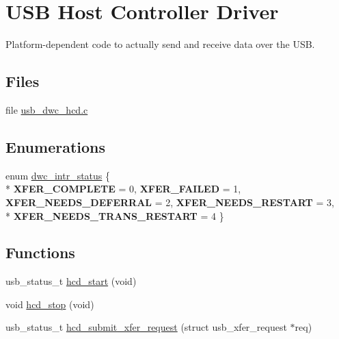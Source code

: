 \hypertarget{group__usbhcd}{\section{U\-S\-B Host Controller Driver}
\label{group__usbhcd}
}


Platform-\/dependent code to actually send and receive data over the U\-S\-B.  


\subsection*{Files}
\begin{DoxyCompactItemize}
\item 
file \hyperlink{usb__dwc__hcd_8c}{usb\-\_\-dwc\-\_\-hcd.\-c}
\end{DoxyCompactItemize}
\subsection*{Enumerations}
\begin{DoxyCompactItemize}
\item 
enum \hyperlink{group__usbhcd_ga7b5f13b20e154376312b7514f9dbcb81}{dwc\-\_\-intr\-\_\-status} \{ \\*
{\bfseries X\-F\-E\-R\-\_\-\-C\-O\-M\-P\-L\-E\-T\-E} = 0, 
{\bfseries X\-F\-E\-R\-\_\-\-F\-A\-I\-L\-E\-D} = 1, 
{\bfseries X\-F\-E\-R\-\_\-\-N\-E\-E\-D\-S\-\_\-\-D\-E\-F\-E\-R\-R\-A\-L} = 2, 
{\bfseries X\-F\-E\-R\-\_\-\-N\-E\-E\-D\-S\-\_\-\-R\-E\-S\-T\-A\-R\-T} = 3, 
\\*
{\bfseries X\-F\-E\-R\-\_\-\-N\-E\-E\-D\-S\-\_\-\-T\-R\-A\-N\-S\-\_\-\-R\-E\-S\-T\-A\-R\-T} = 4
 \}
\end{DoxyCompactItemize}
\subsection*{Functions}
\begin{DoxyCompactItemize}
\item 
usb\-\_\-status\-\_\-t \hyperlink{group__usbhcd_gaab6ab94dcc19ea7a80aed9af1c44ab7d}{hcd\-\_\-start} (void)
\item 
void \hyperlink{group__usbhcd_ga058fc081836262ad2376911fcf7cf14b}{hcd\-\_\-stop} (void)
\item 
usb\-\_\-status\-\_\-t \hyperlink{group__usbhcd_ga72b7448515ed0c92480cb6737009e626}{hcd\-\_\-submit\-\_\-xfer\-\_\-request} (struct usb\-\_\-xfer\-\_\-request $\ast$req)
\end{DoxyCompactItemize}


